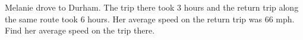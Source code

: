 Melanie drove to Durham. The trip there took $3$ hours and the return trip along the same route took $6$ hours. Her average speed on the return trip was $66$ mph. Find her average speed on the trip there.
